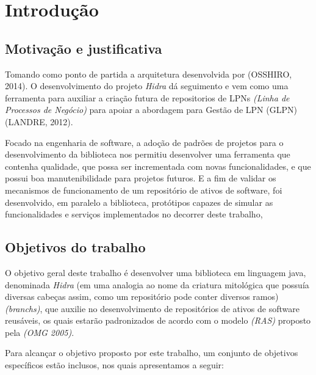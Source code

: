 \chapter{Introdução} \label{chapter:introducao}


\section{Motivação e justificativa} \label{section:sec1}


Tomando como ponto de partida a arquitetura desenvolvida por (OSSHIRO, 2014). O desenvolvimento do projeto \textit{Hidra} dá seguimento e vem como uma ferramenta para auxiliar a criação futura de repositorios de LPNs \textit{(Linha de Processos de Negócio)} para apoiar a abordagem para Gestão de LPN (GLPN) (LANDRE, 2012).

Focado na engenharia de software, a adoção de padrões de projetos para o desenvolvimento da biblioteca nos permitiu desenvolver uma ferramenta que contenha qualidade, que possa ser incrementada com novas funcionalidades, e que possui boa manutenibilidade para projetos futuros. E a fim de validar os mecanismos de funcionamento de um repositório de ativos de software, foi desenvolvido, em paralelo a biblioteca, protótipos capazes de simular as funcionalidades e serviços implementados no decorrer deste trabalho, 

\section{Objetivos do trabalho} \label{section:sec1}

O objetivo geral deste trabalho é desenvolver uma biblioteca em linguagem java, denominada \textit{Hidra} (em uma analogia ao nome da criatura mitológica que possuía diversas cabeças assim, como um repositório pode conter diversos ramos) \textit{(branchs)}, que auxilie no desenvolvimento de repositórios de ativos de software reusáveis, os quais estarão padronizados de acordo com o modelo \textit{(RAS)} proposto pela \textit{(OMG 2005)}.

Para alcançar o objetivo proposto por este trabalho, um conjunto de objetivos específicos estão inclusos, nos quais apresentamos a seguir:

